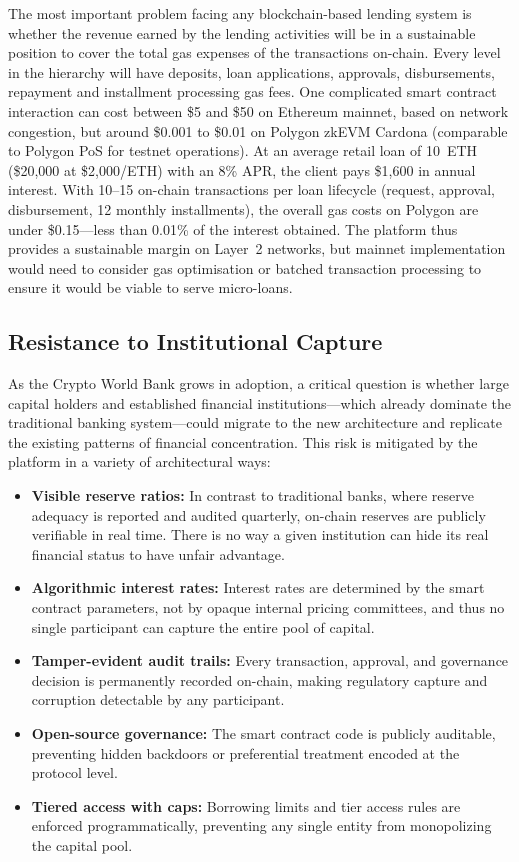 \documentclass[12pt,a4paper]{report}
\begin{document}
The most important problem facing any blockchain-based lending system is whether the revenue earned by the lending activities will be in a sustainable position to cover the total gas expenses of the transactions on-chain. Every level in the hierarchy will have deposits, loan applications, approvals, disbursements, repayment and installment processing gas fees. One complicated smart contract interaction can cost between \$5 and \$50 on Ethereum mainnet, based on network congestion, but around \$0.001 to \$0.01 on Polygon zkEVM Cardona (comparable to Polygon PoS for testnet operations). At an average retail loan of 10~ETH (\$20,000 at \$2,000/ETH) with an 8\% APR, the client pays \$1,600 in annual interest. With 10--15 on-chain transactions per loan lifecycle (request, approval, disbursement, 12 monthly installments), the overall gas costs on Polygon are under \$0.15---less than 0.01\% of the interest obtained. The platform thus provides a sustainable margin on Layer~2 networks, but mainnet implementation would need to consider gas optimisation or batched transaction processing to ensure it would be viable to serve micro-loans.

\subsection{Resistance to Institutional Capture}

As the Crypto World Bank grows in adoption, a critical question is whether large capital holders and established financial institutions---which already dominate the traditional banking system---could migrate to the new architecture and replicate the existing patterns of financial concentration. This risk is mitigated by the platform in a variety of architectural ways:

\begin{itemize}[noitemsep]
\item \textbf{Visible reserve ratios:} In contrast to traditional banks, where reserve adequacy is reported and audited quarterly, on-chain reserves are publicly verifiable in real time. There is no way a given institution can hide its real financial status to have unfair advantage.
\item \textbf{Algorithmic interest rates:} Interest rates are determined by the smart contract parameters, not by opaque internal pricing committees, and thus no single participant can capture the entire pool of capital.
\item \textbf{Tamper-evident audit trails:} Every transaction, approval, and governance decision is permanently recorded on-chain, making regulatory capture and corruption detectable by any participant.
\item \textbf{Open-source governance:} The smart contract code is publicly auditable, preventing hidden backdoors or preferential treatment encoded at the protocol level.
\item \textbf{Tiered access with caps:} Borrowing limits and tier access rules are enforced programmatically, preventing any single entity from monopolizing the capital pool.
\end{itemize}
\end{document}

